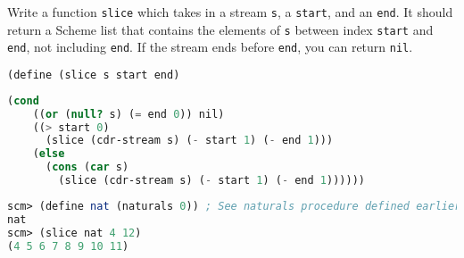 \question Write a function \texttt{slice} which takes in a stream \texttt{s},
a \texttt{start}, and an \texttt{end}.
It should return a Scheme list that contains the elements of \texttt{s} between
index \texttt{start} and \texttt{end}, not including \texttt{end}. If the stream
ends before \texttt{end}, you can return \texttt{nil}.

\begin{lstlisting}[language=Scheme]
(define (slice s start end)
\end{lstlisting}
\begin{solution}[4cm]
\begin{lstlisting}[language=Scheme]
  (cond
    ((or (null? s) (= end 0)) nil)
    ((> start 0)
      (slice (cdr-stream s) (- start 1) (- end 1)))
    (else
      (cons (car s)
        (slice (cdr-stream s) (- start 1) (- end 1))))))
\end{lstlisting}
\end{solution}
\begin{lstlisting}[language=Scheme]
scm> (define nat (naturals 0)) ; See naturals procedure defined earlier
nat
scm> (slice nat 4 12)
(4 5 6 7 8 9 10 11)
\end{lstlisting}
